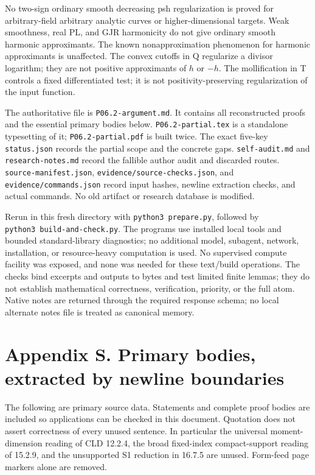 \documentclass[
  10pt,
]{article}
\begin{document}
No two-sign ordinary smooth decreasing psh regularization is proved for
arbitrary-field arbitrary analytic curves or higher-dimensional targets.
Weak smoothness, real PL, and GJR harmonicity do not give ordinary
smooth harmonic approximants. The known nonapproximation phenomenon for
harmonic approximants is unaffected. The convex cutoffs in Q regularize
a divisor logarithm; they are not positive approximants of \(h\) or
\(-h\). The mollification in T controls a fixed differentiated test; it
is not positivity-preserving regularization of the input function.

The authoritative file is \texttt{P06.2-argument.md}. It contains all
reconstructed proofs and the essential primary bodies below.
\texttt{P06.2-partial.tex} is a standalone typesetting of it;
\texttt{P06.2-partial.pdf} is built twice. The exact five-key
\texttt{status.json} records the partial scope and the concrete gaps.
\texttt{self-audit.md} and \texttt{research-notes.md} record the
fallible author audit and discarded routes.
\texttt{source-manifest.json}, \texttt{evidence/source-checks.json}, and
\texttt{evidence/commands.json} record input hashes, newline extraction
checks, and actual commands. No old artifact or research database is
modified.

Rerun in this fresh directory with \texttt{python3\ prepare.py},
followed by \texttt{python3\ build-and-check.py}. The programs use
installed local tools and bounded standard-library diagnostics; no
additional model, subagent, network, installation, or resource-heavy
computation is used. No supervised compute facility was exposed, and
none was needed for these text/build operations. The checks bind
excerpts and outputs to bytes and test limited finite lemmas; they do
not establish mathematical correctness, verification, priority, or the
full atom. Native notes are returned through the required response
schema; no local alternate notes file is treated as canonical memory.

\section{Appendix S. Primary bodies, extracted by newline
boundaries}\label{appendix-s.-primary-bodies-extracted-by-newline-boundaries}

The following are primary source data. Statements and complete proof
bodies are included so applications can be checked in this document.
Quotation does not assert correctness of every unused sentence. In
particular the universal moment-dimension reading of CLD 12.2.4, the
broad fixed-index compact-support reading of 15.2.9, and the unsupported
S1 reduction in 16.7.5 are unused. Form-feed page markers alone are
removed.
\end{document}
